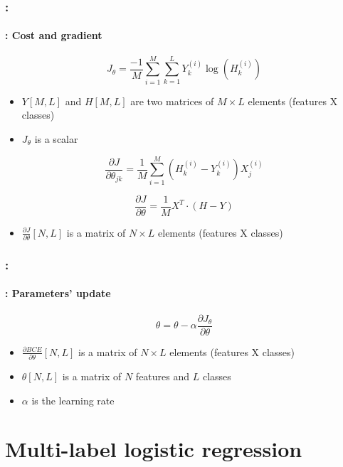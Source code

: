 \documentclass[xcolor=table]{beamer}
\begin{document}
\begin{frame}
	\frametitle{\insertshortsubtitle: \insertsection}
	\framesubtitle{\insertsubsection: Cost and gradient}
	
	\[J_\theta = \frac{-1}{M} \sum\limits_{i=1}^{M} \sum_{k=1}^{L} Y^{(i)}_k \log(H^{(i)}_k)\]
	\begin{itemize}
		\item $Y[M, L]$ and $H[M, L]$ are two matrices of $M\times L$ elements (features X classes)
		\item $J_\theta$ is a scalar
	\end{itemize}
	
	\[
	\frac{\partial J}{\partial \theta_{jk}} = \frac{1}{M} \sum\limits_{i=1}^{M} (H^{(i)}_k - Y^{(i)}_k) X_j^{(i)}
	\]
	
	\[
	\frac{\partial J}{\partial \theta} = \frac{1}{M} X^T \cdot (H - Y)
	\]
	
	\begin{itemize}
		\item $\frac{\partial J}{\partial \theta}[N, L]$ is a matrix of $N\times L$ elements (features X classes)
	\end{itemize}
	
\end{frame}

\begin{frame}
	\frametitle{\insertshortsubtitle: \insertsection}
	\framesubtitle{\insertsubsection: Parameters' update}
	
	\[\theta = \theta - \alpha \frac{\partial J_\theta}{\partial \theta}\]
	
	\begin{itemize}
		\item $\frac{\partial BCE}{\partial \theta}[N, L]$ is a matrix of $N\times L$ elements (features X classes)
		\item $\theta[N, L]$ is a matrix of $N$ features and $L$ classes
		\item $\alpha$ is the learning rate
	\end{itemize}
	
\end{frame}

\section{Multi-label logistic regression}

\begin{frame}
	\frametitle{\insertshortsubtitle}
	\framesubtitle{\insertsection}
	
	
\end{frame}
\end{document}
